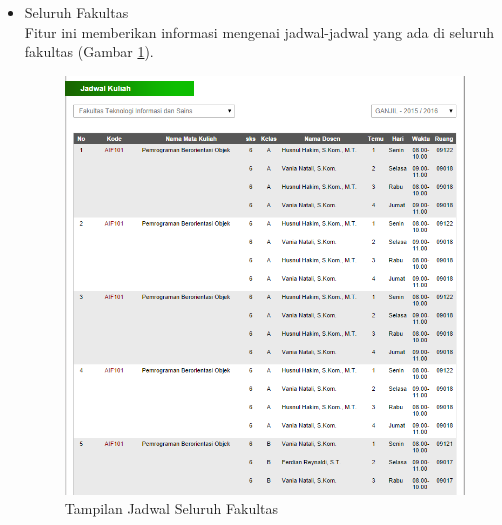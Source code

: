 \documentclass[a4paper,twoside]{article}
\begin{document}
\begin{enumerate}
\begin{enumerate}
\begin{enumerate}
\begin{itemize}
\begin{itemize}
			\item Seluruh Fakultas \\
			Fitur ini memberikan informasi mengenai jadwal-jadwal yang ada di seluruh fakultas (Gambar \ref{fig:3_pam_utama_jadwalall}).
			\begin{figure}[H]
				\centering
				\includegraphics[scale=0.5]{Gambar/pam-utama-jadwalall}
				\caption{Tampilan Jadwal Seluruh Fakultas} 
				\label{fig:3_pam_utama_jadwalall}
			\end{figure}
		\end{itemize}
		

\end{itemize}
\end{enumerate}
\end{enumerate}
\end{enumerate}
\end{document}

